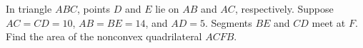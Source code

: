 In triangle $ABC$, points $D$ and $E$ lie on $AB$ and $AC$, respectively. Suppose $AC=CD=10$, $AB=BE=14$, and $AD=5$. Segments $BE$ and $CD$ meet at $F$. Find the area of the nonconvex quadrilateral $ACFB$.
